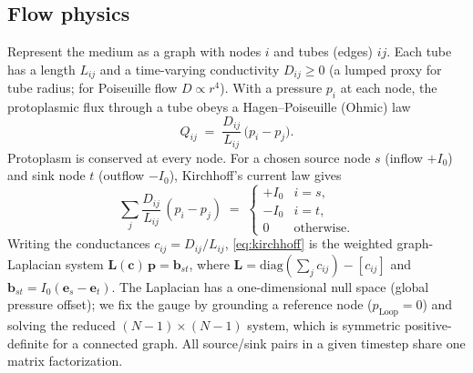 \documentclass[11pt]{article}
\newcommand{\D}{D}
\begin{document}
\subsection{Flow physics}
Represent the medium as a graph with nodes $i$ and tubes (edges) $ij$. Each tube has a
length $L_{ij}$ and a time-varying conductivity $\D_{ij}\ge 0$ (a lumped proxy for tube
radius; for Poiseuille flow $\D \propto r^4$). With a pressure $p_i$ at each node, the
protoplasmic flux through a tube obeys a Hagen--Poiseuille (Ohmic) law
\begin{equation}
Q_{ij} \;=\; \frac{\D_{ij}}{L_{ij}}\,\bigl(p_i - p_j\bigr).
\label{eq:flux}
\end{equation}
Protoplasm is conserved at every node. For a chosen source node $s$ (inflow $+I_0$) and
sink node $t$ (outflow $-I_0$), Kirchhoff's current law gives
\begin{equation}
\sum_{j} \frac{\D_{ij}}{L_{ij}}\,(p_i-p_j)
\;=\;
\begin{cases}
+I_0 & i=s,\\
-I_0 & i=t,\\
0 & \text{otherwise.}
\end{cases}
\label{eq:kirchhoff}
\end{equation}
Writing the conductances $c_{ij}=\D_{ij}/L_{ij}$, \eqref{eq:kirchhoff} is the weighted
graph-Laplacian system $\mathbf{L}(\mathbf{c})\,\mathbf{p}=\mathbf{b}_{st}$, where
$\mathbf{L}=\mathrm{diag}(\sum_j c_{ij})-[c_{ij}]$ and $\mathbf{b}_{st}=I_0(\mathbf{e}_s-\mathbf{e}_t)$.
The Laplacian has a one-dimensional null space (global pressure offset); we fix the gauge
by grounding a reference node ($p_{\text{Loop}}=0$) and solving the reduced
$(N\!-\!1)\times(N\!-\!1)$ system, which is symmetric positive-definite for a connected
graph. All source/sink pairs in a given timestep share one matrix factorization.
\end{document}
